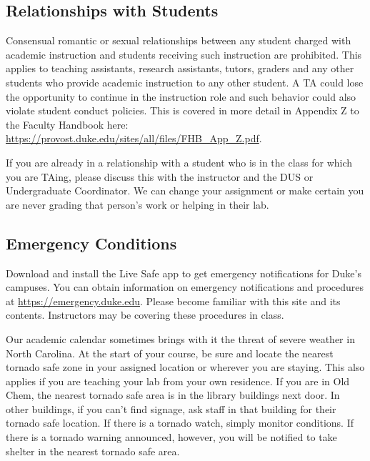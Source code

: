\documentclass[
]{article}
\begin{document}
\hypertarget{relationships-with-students}{%
\subsection{Relationships with Students}\label{relationships-with-students}}

Consensual romantic or sexual relationships between any student charged with academic instruction and students receiving such instruction are prohibited. This applies to teaching assistants, research assistants, tutors, graders and any other students who provide academic instruction to any other student. A TA could lose the opportunity to continue in the instruction role and such behavior could also violate student conduct policies. This is covered in more detail in Appendix Z to the Faculty Handbook here: \url{https://provost.duke.edu/sites/all/files/FHB_App_Z.pdf}.

If you are already in a relationship with a student who is in the class for which you are TAing, please discuss this with the instructor and the DUS or Undergraduate Coordinator. We can change your assignment or make certain you are never grading that person's work or helping in their lab.

\hypertarget{emergency-conditions}{%
\subsection{Emergency Conditions}\label{emergency-conditions}}

Download and install the Live Safe app to get emergency notifications for Duke's campuses. You can obtain information on emergency notifications and procedures at \url{https://emergency.duke.edu}. Please become familiar with this site and its contents. Instructors may be covering these procedures in class.

Our academic calendar sometimes brings with it the threat of severe weather in North Carolina. At the start of your course, be sure and locate the nearest tornado safe zone in your assigned location or wherever you are staying. This also applies if you are teaching your lab from your own residence. If you are in Old Chem, the nearest tornado safe area is in the library buildings next door. In other buildings, if you can't find signage, ask staff in that building for their tornado safe location. If there is a tornado watch, simply monitor conditions. If there is a tornado warning announced, however, you will be notified to take shelter in the nearest tornado safe area.
\end{document}
